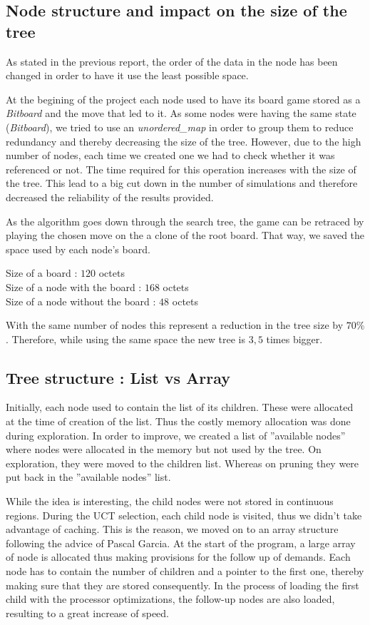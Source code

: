 \subsection{Node structure and impact on the size of the tree}

As stated in the previous report, the order of the data in the node has been changed in order to have it use the least possible space.

At the begining of the project each node used to have its board game stored as a \textit{Bitboard} and the move that led to it. As some nodes were having the same state (\textit{Bitboard}), we tried to use an \textit{unordered\_map} in order to group them to reduce redundancy and thereby decreasing the size of the tree. However, due to the high number of nodes, each time we created one we had to check whether it was referenced or not. The time required for this operation increases with the size of the tree. This lead to a big cut down in the number of simulations and therefore decreased the reliability of the results provided.

As the algorithm goes down through the search tree, the game can be retraced by playing the chosen move on the a clone of the root board. That way, we saved the space used by each node's board.

\noindent
Size of a board : $120$ octets\\
Size of a node with the board : $168$ octets\\
Size of a node without the board : $48$ octets

With the same number of nodes this represent a reduction in the tree size by $70\%$. Therefore, while using the same space the new tree is $3,5$ times bigger.

\subsection{Tree structure : List vs Array}

Initially, each node used to contain the list of its children. These were allocated at the time of creation of the list. Thus the costly memory allocation was done during exploration.
In order to improve, we created a list of ''available nodes'' where nodes were allocated in the memory but not used by the tree. On exploration, they were moved to the children list. Whereas on pruning they were put back in the ''available nodes'' list.

While the idea is interesting, the child nodes were not stored in continuous regions. During the UCT selection, each child node is visited, thus we didn't take advantage of caching. This is the reason, we moved on to an array structure following the advice of Pascal Garcia. At the start of the program, a large array of node is allocated thus making provisions for the follow up of demands. Each node has to contain the number of children and a pointer to the first one, thereby making sure that they are stored consequently. In the process of loading the first child with the processor optimizations, the follow-up nodes are also loaded, resulting to a great increase of speed.

